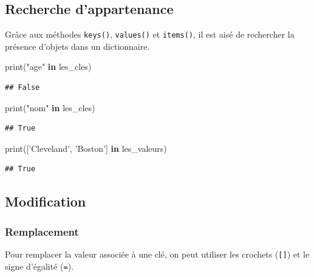 \documentclass[12pt,]{book}
\newenvironment{Shaded}{\begin{snugshade}}{\end{snugshade}}
\newcommand{\KeywordTok}[1]{\textcolor[rgb]{0.13,0.29,0.53}{\textbf{#1}}}
\newcommand{\StringTok}[1]{\textcolor[rgb]{0.31,0.60,0.02}{#1}}
\newcommand{\BuiltInTok}[1]{#1}
\newcommand{\NormalTok}[1]{#1}
\numberwithin{equation}{section}
\numberwithin{countremarque}{section}
\begin{document}
\subsection{Recherche d'appartenance}\label{recherche-dappartenance}

Grâce aux méthodes \texttt{keys()}, \texttt{values()} et
\texttt{items()}, il est aisé de rechercher la présence d'objets dans un
dictionnaire.

\begin{Shaded}
\begin{Highlighting}[]
\BuiltInTok{print}\NormalTok{(}\StringTok{"age"} \KeywordTok{in}\NormalTok{ les_cles)}
\end{Highlighting}
\end{Shaded}

\begin{lstlisting}
## False
\end{lstlisting}

\begin{Shaded}
\begin{Highlighting}[]
\BuiltInTok{print}\NormalTok{(}\StringTok{"nom"} \KeywordTok{in}\NormalTok{ les_cles)}
\end{Highlighting}
\end{Shaded}

\begin{lstlisting}
## True
\end{lstlisting}

\begin{Shaded}
\begin{Highlighting}[]
\BuiltInTok{print}\NormalTok{([}\StringTok{'Cleveland'}\NormalTok{, }\StringTok{'Boston'}\NormalTok{] }\KeywordTok{in}\NormalTok{ les_valeurs)}
\end{Highlighting}
\end{Shaded}

\begin{lstlisting}
## True
\end{lstlisting}

\subsection{Modification}\label{modification-2}

\subsubsection{Remplacement}\label{remplacement-1}

Pour remplacer la valeur associée à une clé, on peut utiliser les
crochets (\texttt{{[}{]}}) et le signe d'égalité (\texttt{=}).
\end{document}
